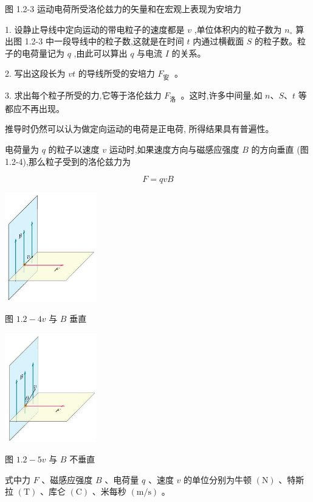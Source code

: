 \documentclass[10pt]{article}
\begin{document}
图 1.2-3 运动电荷所受洛伦兹力的矢量和在宏观上表现为安培力

1. 设静止导线中定向运动的带电粒子的速度都是 \(v\) ,单位体积内的粒子数为 \({n}_{ \circ }\) 算出图 1.2-3 中一段导线中的粒子数,这就是在时间 \(t\) 内通过横截面 \(S\) 的粒子数。粒子的电荷量记为 \(q\) ,由此可以算出 \(q\) 与电流 \(I\) 的关系。

2. 写出这段长为 \({vt}\) 的导线所受的安培力 \({F}_{\text{安 }}\) 。

3. 求出每个粒子所受的力,它等于洛伦兹力 \({F}_{\text{洛 }}\) 。这时,许多中间量,如 \(n\text{、}S\text{、}t\) 等都应不再出现。

推导时仍然可以认为做定向运动的电荷是正电荷, 所得结果具有普遍性。

电荷量为 \(q\) 的粒子以速度 \(v\) 运动时,如果速度方向与磁感应强度 \(B\) 的方向垂直 (图 1.2-4),那么粒子受到的洛伦兹力为

\[
F = {qvB}
\]

\begin{center}
\includegraphics[max width=0.3\textwidth]{images/01910e72-c5b7-7ed5-a6d4-fb3a5faefc32_14_224368.jpg}
\end{center}

图 \({1.2} - {4v}\) 与 \(B\) 垂直

\begin{center}
\includegraphics[max width=0.3\textwidth]{images/01910e72-c5b7-7ed5-a6d4-fb3a5faefc32_14_213138.jpg}
\end{center}

图 \({1.2} - {5v}\) 与 \(B\) 不垂直

式中力 \(F\) 、磁感应强度 \(B\) 、电荷量 \(q\) 、速度 \(v\) 的单位分别为牛顿 \(\left( \mathrm{N}\right)\) 、特斯拉 \(\left( \mathrm{T}\right)\) 、库仑 \(\left( \mathrm{C}\right)\) 、米每秒 \(\left( {\mathrm{m}/\mathrm{s}}\right)\) 。
\end{document}

